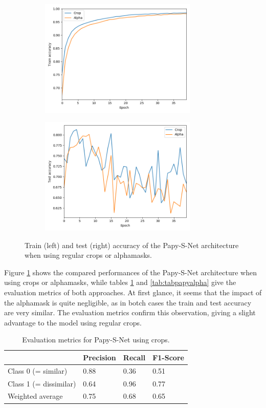 \documentclass[11pt]{report}
\begin{document}
\begin{figure}[h!]
\centering
  \begin{subfigure}{8cm}
    \centering\includegraphics[width=7.5cm]{plot_train_cropalpha.png}
  \end{subfigure}
  \begin{subfigure}{8cm}
    \centering\includegraphics[width=7.5cm]{plot_test_cropalpha.png}
  \end{subfigure}
\caption{Train (left) and test (right) accuracy of the Papy-S-Net architecture when using regular crops or alphamasks.}
\label{alphavscrop}
\end{figure}

Figure \ref{alphavscrop} shows the compared performances of the Papy-S-Net architecture when using crops or alphamasks, while tables \ref{tab:tabpapycrop} and \ref{tab:tabpapyalpha} give the evaluation metrics of both approaches. At first glance, it seems that the impact of the alphamask is quite negligible, as in botch cases the train and test accuracy are very similar. The evaluation metrics confirm this observation, giving a slight advantage to the model using regular crops.\newline

\begin{table}[h!]
\begin{tabular}{l|l|l|l|}
\cline{2-4}
                                             & Precision & Recall & F1-Score \\ \hline
\multicolumn{1}{|l|}{Class 0 (= similar)}    & 0.88      & 0.36   & 0.51     \\ \cline{1-1}
\multicolumn{1}{|l|}{Class 1 (= dissimilar)} & 0.64      & 0.96   & 0.77     \\ \hline
\multicolumn{1}{|l|}{Weighted average}       & 0.75      & 0.68   & 0.65     \\ \hline
\end{tabular}
\caption{Evaluation metrics for Papy-S-Net using crops.}
\label{tab:tabpapycrop}
\end{table}
\end{document}
